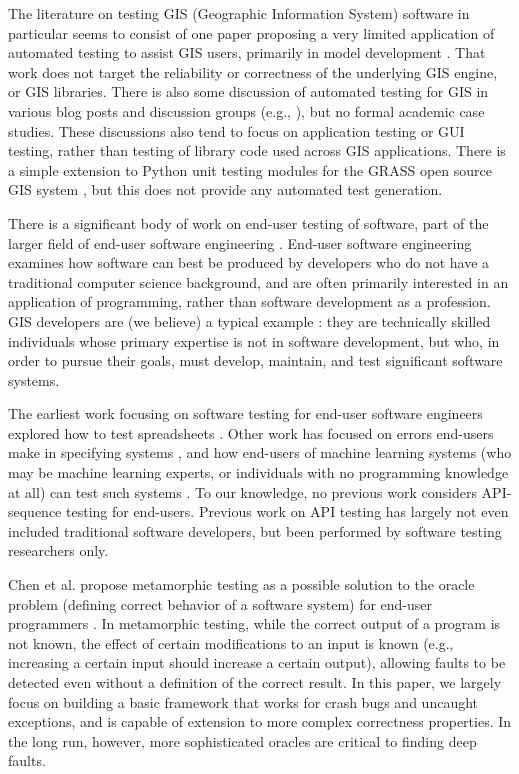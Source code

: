 The literature on testing GIS (Geographic Information System) software in particular seems to consist
of one paper proposing a very limited application of automated testing
to assist GIS users, primarily in model development \cite{GISTest}.
That work does not target the reliability or correctness of the
underlying GIS engine, or GIS libraries.  There is also some
discussion of automated testing for GIS in various blog posts and
discussion groups (e.g., \cite{gisblog1,gisblog2}), but no formal
academic case studies.  These discussions also tend to focus on
application testing or GUI testing, rather than testing of library
code used across GIS applications.  There is a simple extension to
Python unit testing modules for the GRASS open source GIS system
\cite{GRASSunit}, but this does not provide any automated test generation.

There is a significant body of work on end-user testing of software,
part of the larger field of end-user software engineering
\cite{burnettEUSE,Silos}.  End-user software engineering examines how
software can best be produced by developers who do not have a
traditional computer science background, and are often primarily
interested in an application of programming, rather than software
development as a profession.  GIS developers are (we believe) a
typical example \cite{Segal07}:  they are technically skilled  individuals whose
primary expertise is not in software development, but who, in order to
pursue their goals, must develop, maintain, and test significant
software systems.

The earliest work focusing on software testing for
end-user software engineers explored how to test spreadsheets
\cite{rothermelTOSEM,rothermel2000wysiwyt}.  Other work has focused on
errors end-users make in specifying systems \cite{Phalgune}, and how
end-users of machine learning systems (who may be machine learning
experts, or individuals with no programming knowledge at all) can test
such systems \cite{OnlyOracle,kulesza-eud11,shinsel-vlhcc}.  To our
knowledge, no previous work considers API-sequence testing for
end-users.  Previous work on API testing has largely not even included
traditional software developers, but been performed by software
testing researchers only.

Chen et al. propose metamorphic testing
\cite{MetaTest,isstamorph,metamorph,chentest} as a possible solution
to the oracle problem (defining correct behavior of a software system)
for end-user programmers \cite{MetamorphEndUser}.  In metamorphic
testing, while the correct output of a program is not known, the
effect of certain modifications to an input is known (e.g., increasing
a certain input should increase a certain output), allowing faults to
be detected even without a definition of the correct result.  In this
paper, we largely focus on building a basic framework that works for
crash bugs and uncaught exceptions, and is capable of
extension to more complex correctness properties.  In the long run, however, more
sophisticated oracles are critical to finding deep faults.
